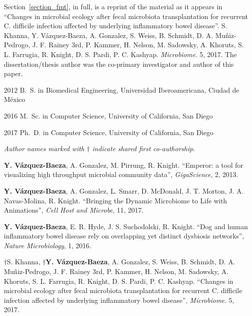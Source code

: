 \begin{frontmatter}
\begin{acknowledgements}
    Section~\ref{section_fmt}, in full, is a reprint of the material as it 
    appears in ``Changes in microbial ecology after fecal microbiota 
    transplantation for recurrent C. difficile infection affected by underlying 
    inflammatory bowel disease''. S. Khanna, Y.  V\'azquez-Baeza, A.  Gonzalez, 
    S. Weiss, B.  Schmidt, D. A.  Muñiz-Pedrogo, J. F. Rainey 3rd, P. Kammer, 
    H. Nelson, M.  Sadowsky, A.  Khoruts, S. L. Farrugia, R. Knight, D. S.  
    Pardi, P. C.  Kashyap. \emph{Microbiome}. 5, 2017. The dissertation/thesis 
    author was the co-primary investigator and author of this paper.

\end{acknowledgements}


%
%
\begin{vitapage}
\begin{vita}
  \item[2012] B.~S. in Biomedical Engineering, Universidad Iberoamericana, Ciudad de M\'exico
  \item[2016] M.~Sc. in Computer Science, University of California, San Diego
  \item[2017] Ph.~D. in Computer Science, University of California, San Diego 
\end{vita}


\begin{publications}

    \item \textsl{Author names marked with $\dagger$ indicate shared first co-authorship}.

    \item \textbf{Y. V\'azquez-Baeza}, A. Gonzalez, M. Pirrung, R. Knight. ``Emperor: a tool for visualizing high throughput microbial community data'', \emph{GigaScience}, 2, 2013.

    \item \textbf{Y. V\'azquez-Baeza}, A. Gonzalez, L. Smarr, D. McDonald, J. T. Morton, J. A. Navas-Molina, R. Knight. ``Bringing the Dynamic Microbiome to Life with Animations'', \emph{Cell Host and Microbe}, 11, 2017.

    \item \textbf{Y. V\'azquez-Baeza}, E. R. Hyde, J. S. Suchodolski, R. Knight. ``Dog and human inflammatory bowel disease rely on overlapping yet distinct dysbiosis networks'', \emph{Nature Microbiology}, 1, 2016.

    \item  $\dagger$S. Khanna, \textbf{$\dagger$Y. V\'azquez-Baeza}, A.  
        Gonzalez, S. Weiss, B. Schmidt, D. A. Muñiz-Pedrogo, J. F. Rainey 3rd, 
        P. Kammer, H. Nelson, M. Sadowsky, A. Khoruts, S. L. Farrugia, R.  
        Knight, D. S. Pardi, P. C. Kashyap. ``Changes in microbial ecology 
        after fecal microbiota transplantation for recurrent C. difficile 
        infection affected by underlying inflammatory bowel disease'', 
        \emph{Microbiome}. 5, 2017.


\end{publications}
\end{vitapage}
\end{frontmatter}
